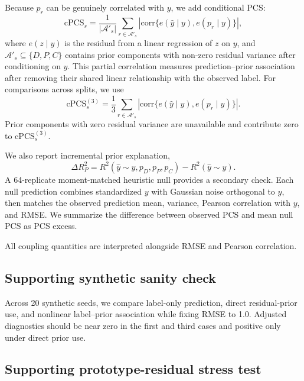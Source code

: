 \documentclass[conference]{IEEEtran}
\begin{document}
Because $p_r$ can be genuinely correlated with $y$, we add conditional PCS:
\begin{equation}
\mathrm{cPCS}_s=\frac{1}{|\mathcal A'_s|}\sum_{r\in\mathcal A'_s}
\left|\mathrm{corr}\{e(\hat y\mid y),e(p_r\mid y)\}\right|,
\end{equation}
where $e(z\mid y)$ is the residual from a linear regression of $z$ on $y$, and $\mathcal A'_s\subseteq\{D,P,C\}$ contains prior components with non-zero residual variance after conditioning on $y$. This partial correlation measures prediction--prior association after removing their shared linear relationship with the observed label. For comparisons across splits, we use
\begin{equation}
\mathrm{cPCS}^{(3)}_s=\frac{1}{3}\sum_{r\in\mathcal A'_s}
\left|\mathrm{corr}\{e(\hat y\mid y),e(p_r\mid y)\}\right|.
\end{equation}
Prior components with zero residual variance are unavailable and contribute zero to $\mathrm{cPCS}^{(3)}_s$.

We also report incremental prior explanation,
\begin{equation}
\Delta R^2_P=R^2(\hat y\sim y,p_D,p_P,p_C)-R^2(\hat y\sim y).
\end{equation}
A 64-replicate moment-matched heuristic null provides a secondary check. Each null prediction combines standardized $y$ with Gaussian noise orthogonal to $y$, then matches the observed prediction mean, variance, Pearson correlation with $y$, and RMSE. We summarize the difference between observed PCS and mean null PCS as PCS excess.

All coupling quantities are interpreted alongside RMSE and Pearson correlation.

\subsection{Supporting synthetic sanity check}

Across 20 synthetic seeds, we compare label-only prediction, direct residual-prior use, and nonlinear label--prior association while fixing RMSE to 1.0. Adjusted diagnostics should be near zero in the first and third cases and positive only under direct prior use.

\subsection{Supporting prototype-residual stress test}
\end{document}
